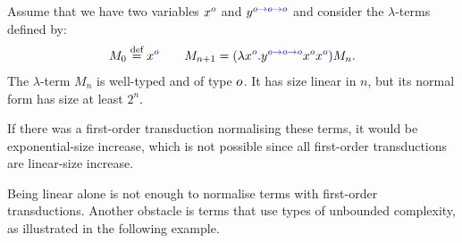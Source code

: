 \begin{example}\label{ex:exponential}
    Assume that we have two variables ${x}^{{\color{blue}o}}$ and ${y}^{{\color{blue}o \to o \to o}}$ and consider the $\lambda$-terms defined by:
    \begin{align*}
        M_0 \stackrel{\text{def}}= {x}^{{\color{blue}o}} \qquad M_{n+1} = (\lambda {x}^{{\color{blue}o}} . {y}^{{\color{blue}o \to o \to o}}  {x}^{{\color{blue}o}} {x}^{{\color{blue}o}})M_n.
    \end{align*}
    The $\lambda$-term $M_n$ is well-typed and of type $o$. It has size linear in $n$, but its normal form has size at least $2^n$. 
\end{example}
If there was a first-order transduction normalising these terms, it would be exponential-size increase, which is not possible since all first-order transductions are linear-size increase. 

Being linear alone is not enough to normalise terms with first-order transductions. Another obstacle is terms that use types of unbounded complexity, as illustrated in the following example. 

